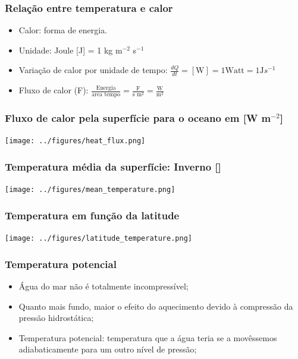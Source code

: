 \begin{frame}
\frametitle{Relação entre temperatura e calor}
    \small{
    \begin{itemize}[<+-| alert@+>]
    \item Calor: forma de energia.
    \item Unidade: Joule [J] = 1 kg m$^{-2}$ s$^{-1}$
    \item Variação de calor por unidade de tempo:
        $\frac{dQ}{dt} = [\text{W}] = 1 \text{Watt} = 1 \text{J} s^{-1}$
    \item Fluxo de calor (F):
        $\frac{\text{Energia}}{\text{area tempo}} = \frac{\text{F}}{\text{s m}^{2}} = \frac{\text{W}}{\text{m}^2}$
    \end{itemize}
    }
\end{frame}

\begin{frame}
\frametitle{Fluxo de calor pela superfície para o oceano em [W m$^{-2}$]}
    \begin{center}
        \texttt{[image: ../figures/heat\_flux.png]}
    \end{center}
\end{frame}

\begin{frame}
\frametitle{Temperatura média da superfície: Inverno  [\textcelsius]}
    \begin{center}
        \texttt{[image: ../figures/mean\_temperature.png]}
    \end{center}
\end{frame}

\begin{frame}
\frametitle{Temperatura em função da latitude}
    \begin{center}
        \texttt{[image: ../figures/latitude\_temperature.png]}
    \end{center}
\end{frame}

\begin{frame}
\frametitle{Temperatura potencial}
    \small{
    \begin{itemize}[<+-| alert@+>]
    \item Água do mar não é totalmente incompressível;
    \item Quanto mais fundo, maior o efeito do aquecimento devido à compressão
          da pressão hidrostática;
    \item Temperatura potencial: temperatura que a água teria se a movêssemos
          adiabaticamente para um outro nível de pressão;
    \end{itemize}
    }
\end{frame}

